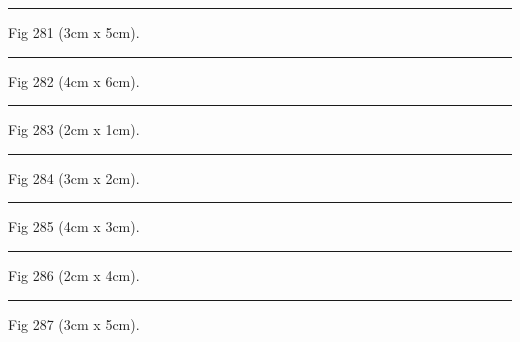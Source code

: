 \documentclass[a4paper,11pt]{article}
\begin{document}
\begin{swarmwrap}%
  \begin{minipage}[t]{3cm}
    \centering
    \rule{\linewidth}{5cm}
    {\footnotesize Fig 281 (3cm x 5cm).}
  \end{minipage}%
\end{swarmwrap}%
\swarmwrapnext
\lipsum[131]%

\begin{swarmwrap}%
  \begin{minipage}[t]{4cm}
    \centering
    \rule{\linewidth}{6cm}
    {\footnotesize Fig 282 (4cm x 6cm).}
  \end{minipage}%
\end{swarmwrap}%
\swarmwrapnext
\lipsum[132]%

\begin{swarmwrap}%
  \begin{minipage}[t]{2cm}
    \centering
    \rule{\linewidth}{1cm}
    {\footnotesize Fig 283 (2cm x 1cm).}
  \end{minipage}%
\end{swarmwrap}%
\swarmwrapnext
\lipsum[133]%

\begin{swarmwrap}%
  \begin{minipage}[t]{3cm}
    \centering
    \rule{\linewidth}{2cm}
    {\footnotesize Fig 284 (3cm x 2cm).}
  \end{minipage}%
\end{swarmwrap}%
\swarmwrapnext
\lipsum[134]%

\begin{swarmwrap}%
  \begin{minipage}[t]{4cm}
    \centering
    \rule{\linewidth}{3cm}
    {\footnotesize Fig 285 (4cm x 3cm).}
  \end{minipage}%
\end{swarmwrap}%
\swarmwrapnext
\lipsum[135]%

\begin{swarmwrap}%
  \begin{minipage}[t]{2cm}
    \centering
    \rule{\linewidth}{4cm}
    {\footnotesize Fig 286 (2cm x 4cm).}
  \end{minipage}%
\end{swarmwrap}%
\swarmwrapnext
\lipsum[136]%

\begin{swarmwrap}%
  \begin{minipage}[t]{3cm}
    \centering
    \rule{\linewidth}{5cm}
    {\footnotesize Fig 287 (3cm x 5cm).}
  \end{minipage}%
\end{swarmwrap}%
\swarmwrapnext
\lipsum[137]%
\end{document}
